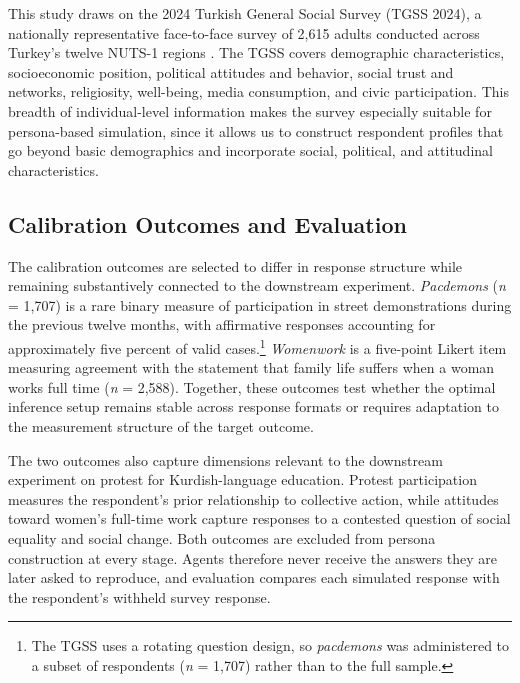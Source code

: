 This study draws on the 2024 Turkish General Social Survey (TGSS 2024), a
nationally representative face-to-face survey of 2,615 adults conducted
across Turkey's twelve NUTS-1 regions \citep{nisanci_tgss_2025}. The TGSS
covers demographic characteristics, socioeconomic position, political
attitudes and behavior, social trust and networks, religiosity, well-being,
media consumption, and civic participation. This breadth of
individual-level information makes the survey especially suitable for
persona-based simulation, since it allows us to construct respondent
profiles that go beyond basic demographics and incorporate social,
political, and attitudinal characteristics.

\subsection{Calibration Outcomes and Evaluation}
\label{sec:outcomes}

The calibration outcomes are selected to differ in response structure while
remaining substantively connected to the downstream experiment.
\textit{Pacdemons} (\textit{n} = 1,707) is a rare binary measure of
participation in street demonstrations during the previous twelve months,
with affirmative responses accounting for approximately five percent of
valid cases.\footnote{The TGSS uses a rotating question design, so
\textit{pacdemons} was administered to a subset of respondents (\textit{n} =
1,707) rather than to the full sample.} \textit{Womenwork} is a five-point
Likert item measuring agreement with the statement that family life suffers
when a woman works full time (\textit{n} = 2,588). Together, these outcomes
test whether the optimal inference setup remains stable across response
formats or requires adaptation to the measurement structure of the target
outcome.

The two outcomes also capture dimensions relevant to the downstream
experiment on protest for Kurdish-language education. Protest participation
measures the respondent's prior relationship to collective action, while
attitudes toward women's full-time work capture responses to a contested
question of social equality and social change. Both outcomes are excluded
from persona construction at every stage. Agents therefore never receive
the answers they are later asked to reproduce, and evaluation compares each
simulated response with the respondent's withheld survey response.

